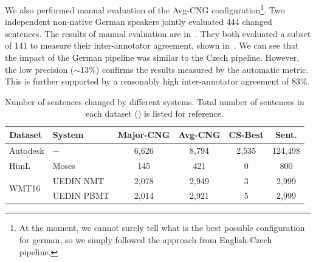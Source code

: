 \begin{table}[t]
\centering
\small
{}
\caption[Final German MLFix evaluation]{
    Final evaluation of the Englsh-German configuration of MLFix using BLUE metric.
	Values are multiplied by 100 for easier reading. Majority-CNG and Avg-CNG methods were compared
with the best English-Czech configuration.
}
\label{final_de-summary}
\end{table}

We also performed manual evaluation of the Avg-CNG configuration\footnote{At the moment, we cannot surely tell what is
the best possible configuration for german, so we simply followed the approach from English-Czech pipeline.}. Two
independent non-native German speakers jointly evaluated 444 changed sentences. The results of manual evaluation are in~.
They both evaluated a subset of 141 to measure their inter-annotator agreement, shown in~.
We can see that the impact of the German pipeline was similar to the Czech pipeline. However, the low precision ($\sim$13\%)
confirms the results measured by the automatic metric. This is further supported by a reasonably high inter-annotator agreement of 83\%.

\begin{table}[t]
\centering
\small

\begin{tabular}{|l|l||c|c|c||c|}
\hline
Dataset  &  System  &  Major-CNG  &  Avg-CNG  &  CS-Best  &  Sent.  \\
\hline
\hline
Autodesk  &  $-$  &  6,626  &  8,794  &  2,535  &  124,498  \\
\hline
HimL  &  Moses  &  145  &  421  &  0  &  800  \\
\hline
\multirow{2}{*}{WMT16}  &  UEDIN NMT  &  2,078  &  2,949  &  3  &  2,999  \\
&  UEDIN PBMT  &  2,014  &  2,921  &  5  &  2,999  \\
\hline
\end{tabular}

\caption[Final German MLFix evaluation - number of changed sentences]{
    Number of sentences changed by different systems. Total number of
sentences in each dataset () is listed for reference.
}   
\label{final_de-chgd}
\end{table}



